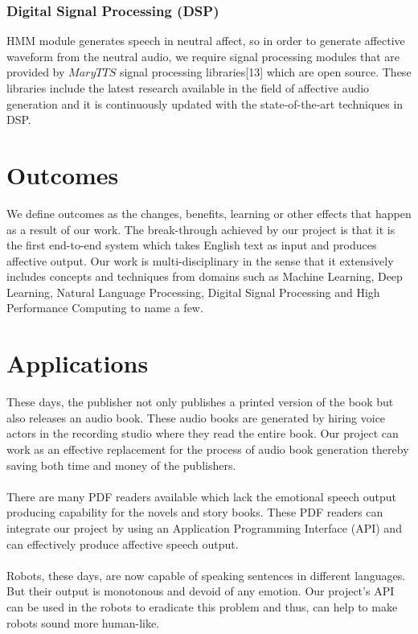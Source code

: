 \documentclass[oneside,a4paper,12pt]{book}
\begin{document}
	\subsubsection{Digital Signal Processing (DSP)}
	HMM module generates speech in neutral affect, so in order to generate affective waveform from the neutral audio, we require signal processing modules that are provided by $MaryTTS$ signal processing libraries[13] which are open source. These libraries include the latest research available in the field of affective audio generation and it is continuously updated with the state-of-the-art techniques in DSP.



\section{Outcomes}
 We define outcomes as the changes, benefits, learning or other effects that happen as a result of our work. The break-through achieved by our project is that it is the first end-to-end system which takes English text as input and produces affective output. Our work is multi-disciplinary in the sense that it extensively includes concepts and techniques from domains such as Machine Learning, Deep Learning, Natural Language Processing, Digital Signal Processing and High Performance Computing to name a few.

\section{Applications}
These days, the publisher not only publishes a printed version of the book but also releases an audio book. These audio books are generated by hiring voice actors in the recording studio where they read the entire book. Our project can work as an effective replacement for the process of audio book generation thereby saving both time and money of the publishers.\\\\
There are many PDF readers available which lack the emotional speech output producing capability for the novels and story books. These PDF readers can integrate our project by using an Application Programming Interface (API) and can effectively produce affective speech output.\\\\
Robots, these days, are now capable of speaking sentences in different languages. But their output is monotonous and devoid of any emotion. Our project's API can be used in the robots to eradicate this problem and thus, can help to make robots sound more human-like.
\end{document}
